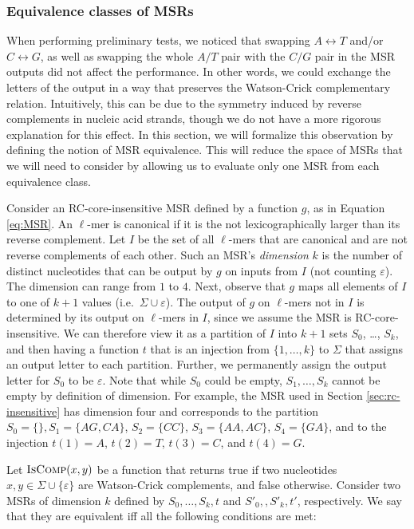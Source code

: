 \documentclass[
  11,
]{scrbook}
\begin{document}
\hypertarget{sec:equiv}{%
\subsubsection{Equivalence classes of MSRs}\label{sec:equiv}}

When performing preliminary tests, we noticed that swapping
\(A\leftrightarrow T\) and/or \(C\leftrightarrow G\), as well as swapping
the whole \(A/T\) pair with the \(C/G\) pair in the MSR outputs did not
affect the performance. In other words, we could exchange the letters of
the output in a way that preserves the Watson-Crick complementary
relation. Intuitively, this can be due to the symmetry induced by
reverse complements in nucleic acid strands, though we do not have a
more rigorous explanation for this effect. In this section, we will
formalize this observation by defining the notion of MSR equivalence.
This will reduce the space of MSRs that we will need to consider by
allowing us to evaluate only one MSR from each equivalence class.

Consider an RC-core-insensitive MSR defined by a function \(g\), as in
Equation \eqref{eq:MSR}. An \(\ell\)-mer is canonical if it is the not lexicographically larger than
its reverse complement. Let \(I\) be the set of all \(\ell\)-mers that are
canonical and are not reverse complements of each other. Such an MSR's
\emph{dimension} \(k\) is the number of distinct nucleotides that can be output
by \(g\) on inputs from \(I\) (not counting \(\varepsilon\)). The dimension
can range from \(1\) to \(4\). Next, observe that \(g\) maps all elements of
\(I\) to one of \(k+ 1\) values (i.e.~\(\Sigma \cup \varepsilon\)). The output
of \(g\) on \(\ell\)-mers not in \(I\) is determined by its output on
\(\ell\)-mers in \(I\), since we assume the MSR is RC-core-insensitive. We
can therefore view it as a partition of \(I\) into \(k+1\) sets \(S_0\), \ldots,
\(S_k\), and then having a function \(t\) that is an injection from
\(\{1, \ldots, k\}\) to \(\Sigma\) that assigns an output letter to each
partition. Further, we permanently assign the output letter for \(S_0\) to
be \(\varepsilon\). Note that while \(S_0\) could be empty,
\(S_1, \ldots, S_k\) cannot be empty by definition of dimension. For
example, the MSR used in Section
\ref{sec:rc-insensitive} has dimension four and corresponds to
the partition \(S_0 = \{\},S_1=\{AG,CA\}\), \(S_2=\{CC\}\), \(S_3=\{AA,AC\}\), \(S_4=\{GA\}\), and to the
injection \(t(1) = A\), \(t(2) =T\), \(t(3) = C\), and \(t(4) = G\).

Let \(\textsc{IsComp}(x,y)\) be a function that returns true if two
nucleotides \(x, y \in \Sigma \cup \{\varepsilon\}\) are Watson-Crick
complements, and false otherwise. Consider two MSRs of dimension \(k\)
defined by \(S_0, \ldots, S_k, t\) and \(S'_0, , S'_k, t'\), respectively.
We say that they are equivalent iff all the following conditions are
met:
\end{document}
